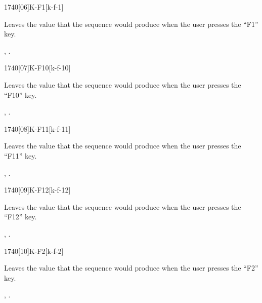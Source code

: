 \begin{worddef}{1740}[06]{K-F1}[k-f-1]%
\item {}

	Leaves the value  that the sequence 
	 would produce when the user presses the
	``F1'' key.

\see {},
	.
\end{worddef}


\begin{worddef}{1740}[07]{K-F10}[k-f-10]%
\item {}

	Leaves the value  that the sequence 
	 would produce when the user presses the
	``F10'' key.

\see {},
	.
\end{worddef}


\begin{worddef}{1740}[08]{K-F11}[k-f-11]%
\item {}

	Leaves the value  that the sequence 
	 would produce when the user presses the
	``F11'' key.

\see {},
	.
\end{worddef}


\begin{worddef}{1740}[09]{K-F12}[k-f-12]%
\item {}

	Leaves the value  that the sequence 
	 would produce when the user presses the
	``F12'' key.

\see {},
	.
\end{worddef}


\begin{worddef}{1740}[10]{K-F2}[k-f-2]%
\item {}

	Leaves the value  that the sequence 
	 would produce when the user presses the
	``F2'' key.

\see {},
	.
\end{worddef}


